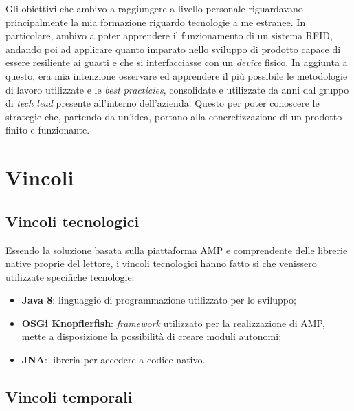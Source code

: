 Gli obiettivi che ambivo a raggiungere a livello personale riguardavano principalmente la mia formazione riguardo tecnologie a me estranee. 
In particolare, ambivo a poter apprendere il funzionamento di un sistema RFID, andando poi ad applicare quanto imparato nello sviluppo di prodotto 
capace di essere resiliente ai guasti e che si interfacciasse con un \emph{device} fisico.
In aggiunta a questo, era mia intenzione osservare ed apprendere il più possibile le metodologie di lavoro utilizzate e le \emph{best practicies}, consolidate
e utilizzate da anni dal gruppo di \emph{tech lead} presente all'interno dell'azienda. Questo per poter conoscere le strategie che, partendo da un'idea,
portano alla concretizzazione di un prodotto finito e funzionante.
\section{Vincoli}
\subsection{Vincoli tecnologici}
\label{sub-sec:vinc-tec}
Essendo la soluzione basata sulla piattaforma AMP e comprendente delle librerie native proprie del lettore, i vincoli tecnologici hanno fatto si che venissero utilizzate specifiche tecnologie:
\begin{itemize}
    \item \textbf{Java 8}: linguaggio di programmazione utilizzato per lo sviluppo;
    \item \textbf{OSGi Knopflerfish}: \emph{framework} utilizzato per la realizzazione di AMP, mette a disposizione la possibilità di creare moduli autonomi;
    \item \textbf{JNA}: libreria per accedere a codice nativo.
\end{itemize}

\subsection{Vincoli temporali}

